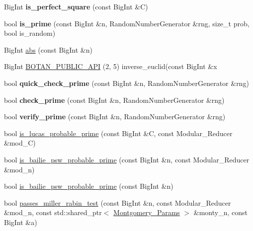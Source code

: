 \begin{DoxyCompactItemize}
\item 
\mbox{\label{namespace_botan_ac8cad18832eb12cc47d3adf4d3767b79}} 
Big\+Int {\bfseries is\+\_\+perfect\+\_\+square} (const Big\+Int \&C)
\item 
\mbox{\label{namespace_botan_a6aedffce7573b1c1a8c747c4fc1d52a9}} 
bool {\bfseries is\+\_\+prime} (const Big\+Int \&n, Random\+Number\+Generator \&rng, size\+\_\+t prob, bool is\+\_\+random)
\item 
Big\+Int \mbox{\hyperlink{namespace_botan_a481ae8e7fe0268600101ab74663f3f16}{abs}} (const Big\+Int \&n)
\item 
Big\+Int \mbox{\hyperlink{namespace_botan_a0f25b10ed41d28e8a0f7026b35b96838}{B\+O\+T\+A\+N\+\_\+\+P\+U\+B\+L\+I\+C\+\_\+\+A\+PI}} (2, 5) inverse\+\_\+euclid(const Big\+Int \&x
\item 
\mbox{\label{namespace_botan_a84349165e2e06442d77db64cdb76bfee}} 
bool {\bfseries quick\+\_\+check\+\_\+prime} (const Big\+Int \&n, Random\+Number\+Generator \&rng)
\item 
\mbox{\label{namespace_botan_af6f2e869065b1860fa41959f72ce6dd8}} 
bool {\bfseries check\+\_\+prime} (const Big\+Int \&n, Random\+Number\+Generator \&rng)
\item 
\mbox{\label{namespace_botan_aaafcd26fc5a710d6c4656e1201d4d1be}} 
bool {\bfseries verify\+\_\+prime} (const Big\+Int \&n, Random\+Number\+Generator \&rng)
\item 
bool \mbox{\hyperlink{namespace_botan_adfa47db9abf09a2846078163792d949c}{is\+\_\+lucas\+\_\+probable\+\_\+prime}} (const Big\+Int \&C, const Modular\+\_\+\+Reducer \&mod\+\_\+C)
\item 
bool \mbox{\hyperlink{namespace_botan_aa000b3df41820d97dbeef2594dd82843}{is\+\_\+bailie\+\_\+psw\+\_\+probable\+\_\+prime}} (const Big\+Int \&n, const Modular\+\_\+\+Reducer \&mod\+\_\+n)
\item 
bool \mbox{\hyperlink{namespace_botan_a3972bbdb57116e08e72c3559d8db5bf2}{is\+\_\+bailie\+\_\+psw\+\_\+probable\+\_\+prime}} (const Big\+Int \&n)
\item 
bool \mbox{\hyperlink{namespace_botan_a72fa2ef88c6068dab54c14e9b5571b51}{passes\+\_\+miller\+\_\+rabin\+\_\+test}} (const Big\+Int \&n, const Modular\+\_\+\+Reducer \&mod\+\_\+n, const std\+::shared\+\_\+ptr$<$ \mbox{\hyperlink{class_botan_1_1_montgomery___params}{Montgomery\+\_\+\+Params}} $>$ \&monty\+\_\+n, const Big\+Int \&a)

\end{DoxyCompactItemize}
